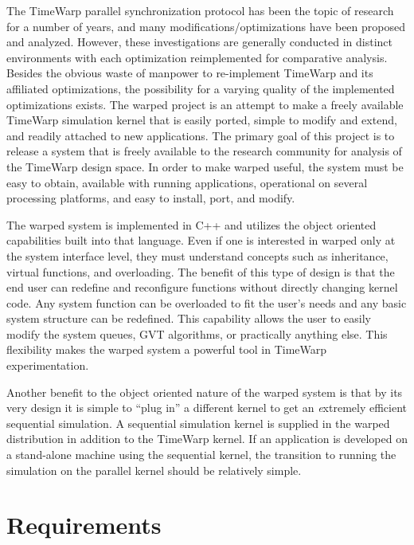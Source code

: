 \documentclass[11pt]{report}
\begin{document}
The TimeWarp parallel synchronization protocol has been the topic of
research for a number of years, and many modifications/optimizations
have been proposed and analyzed.  However, these investigations are
generally conducted in distinct environments with each optimization
reimplemented for comparative analysis.  Besides the obvious waste of
manpower to re-implement TimeWarp and its affiliated optimizations, the
possibility for a varying quality of the implemented optimizations
exists.  The {\sc warped} project is an attempt to make a freely
available TimeWarp simulation kernel that is easily ported, simple to
modify and extend, and readily attached to new applications.  The
primary goal of this project is to release a system that is freely
available to the research community for analysis of the TimeWarp design
space.  In order to make {\sc  warped} useful, the system must be easy to
obtain, available with running applications, operational on several
processing platforms, and easy to install, port, and modify.

The {\sc warped} system is implemented in C++ and utilizes the object
oriented capabilities built into that language.  Even if one is
interested in {\sc warped} only at the system interface level, they must
understand concepts such as inheritance, virtual functions, and
overloading.  The benefit of this type of design is that the end user
can redefine and reconfigure functions without directly changing kernel
code.  Any system function can be overloaded to fit the user's needs and
any basic system structure can be redefined.  This capability allows the
user to easily modify the system queues, GVT algorithms, or practically
anything else.  This flexibility makes the {\sc warped} system a powerful
tool in TimeWarp experimentation.

Another benefit to the object oriented nature of the {\sc warped} system
is that by its very design it is simple to ``plug in'' a different
kernel to get an {\emph extremely} efficient sequential simulation.  A
sequential simulation kernel is supplied in the {\sc warped} distribution
in addition to the TimeWarp kernel.  If an application is developed on
a stand-alone machine using the sequential kernel, the transition to
running the simulation on the parallel kernel should be relatively
simple.

\chapter{Requirements}
\end{document}
